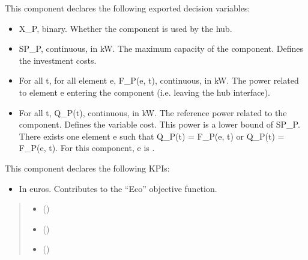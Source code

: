 \documentclass[letterpaper,10pt,english]{sphinxmanual}
\begin{document}
\begin{fulllineitems}
\begin{fulllineitems}
\sphinxAtStartPar
This component declares the following exported decision variables:
\begin{itemize}
\item {} 
\sphinxAtStartPar
X\_P, binary.
Whether the component is used by the hub.

\item {} 
\sphinxAtStartPar
SP\_P, continuous, in kW.
The maximum capacity of the component. Defines the investment costs.

\item {} 
\sphinxAtStartPar
For all t, for all element e, F\_P(e, t), continuous, in kW.
The power related to element e entering the component (i.e. leaving the hub interface).

\item {} 
\sphinxAtStartPar
For all t, Q\_P(t), continuous, in kW.
The reference power related to the component. Defines the variable cost.
This power is a lower bound of SP\_P.
There exists one element e such that Q\_P(t) = F\_P(e, t) or Q\_P(t) = \sphinxhyphen{} F\_P(e, t).
For this component, e is .

\end{itemize}

\sphinxAtStartPar
This component declares the following KPIs:
\begin{itemize}
\item {} 
\sphinxAtStartPar
{}
In euros.
Contributes to the “Eco” objective function.

\end{itemize}
\begin{quote}\begin{description}
\begin{itemize}
\item {} 
\sphinxAtStartPar
{} () \textendash{} 

\item {} 
\sphinxAtStartPar
{} () \textendash{} 

\item {} 
\sphinxAtStartPar
{} ({\hyperref[\detokenize{generated/tamos.element.ElectricityVector:tamos.element.ElectricityVector}]{}}) \textendash{} 


\end{itemize}
\end{description}
\end{quote}
\end{fulllineitems}
\end{fulllineitems}
\end{document}
